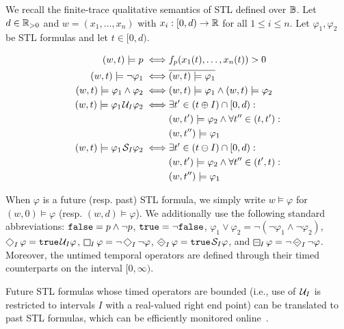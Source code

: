 We recall the finite-trace qualitative semantics of STL defined over $\mathbb{B}$.
Let $d \in \mathbb{R}_{> 0}$ and $w = (x_1, \ldots, x_n)$ with $x_i : [0,d) \to \mathbb{R}$ for all $1 \leq i \leq n$.
Let $\varphi_1, \varphi_2$ be STL formulas and let $t \in [0,d)$.

\bgroup \color{red}
\begin{align*}
	(w,t) \models p \iff & f_p(x_1(t), \ldots, x_n(t)) > 0 \\
	(w,t) \models \lnot \varphi_1 \iff & \overline{(w,t) \models \varphi_1} \\
	(w,t) \models \varphi_1 \land \varphi_2 \iff & (w,t) \models \varphi_1 \land (w,t) \models \varphi_2 \\
	(w,t) \models \varphi_1 \kern.1em\mathcal{U}_I \varphi_2 \iff & \exists t' \in (t \oplus I) \cap [0,d) :  \\
	& (w,t') \models \varphi_2 \land \forall t'' \in (t, t') : \\
	& (w,t'') \models \varphi_1\\
	(w,t) \models \varphi_1 \kern.1em\mathcal{S}_I \varphi_2 \iff & \exists t' \in (t \ominus I) \cap [0,d) :  \\
	& (w,t') \models \varphi_2 \land \forall t'' \in (t', t) : \\
	& (w,t'') \models \varphi_1
\end{align*}

When $\varphi$ is a future (resp. past) STL formula, we simply write $w \models \varphi$ for $(w,0) \models \varphi$ (resp. $(w,d) \models \varphi$).
We additionally use the following standard abbreviations: 
$\texttt{false} = p \land \lnot p$,
$\texttt{true} = \lnot \texttt{false}$,
$ \varphi_1 \lor \varphi_2 = \lnot (\lnot \varphi_1 \land \lnot \varphi_2)$,
$\LTLf_I \varphi = \true \until_I \varphi$,
$\LTLg_I \varphi = \lnot \LTLf_I \lnot \varphi$,
$\LTLdiamondminus_I \varphi = \true \since_I \varphi$, and
$\LTLsquareminus_I \varphi = \lnot \LTLdiamondminus_I \lnot \varphi$.
Moreover, the untimed temporal operators are defined through their timed counterparts on the interval $[0,\infty)$.

Future STL formulas whose timed operators are bounded (i.e., use of $\kern.1em\mathcal{U}_I$ is restricted to intervals $I$ with a real-valued right end point) can be translated to past STL formulas, which can be efficiently monitored online~\cite{MalerNP07,JaksicBGKNN15,Gol18}.
\egroup

